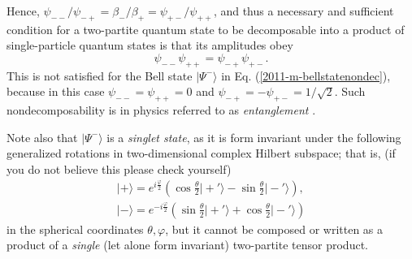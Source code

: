 {Hence,
$\psi_{--}/ \psi_{-+} =   \beta_- / \beta_+ =   \psi_{+-} / \psi_{++}$,
and thus a necessary and sufficient condition for a two-partite quantum state to be decomposable
into a product of single-particle quantum states is that its amplitudes obey
 \begin{equation}
\psi_{--}\psi_{++}  =  \psi_{-+}   \psi_{+-} .
\end{equation}
This is not satisfied for the Bell state $\vert \Psi^-\rangle$ in Eq. (\ref{2011-m-bellstatenondec}),
because in this case $\psi_{--}=\psi_{++} =0$
and  $ \psi_{-+} = - \psi_{+-} =1/\sqrt{2}$.
Such nondecomposability is in physics referred to as {\em entanglement}
\cite{CambridgeJournals:1737068,CambridgeJournals:2027212,schrodinger}.

Note also that $\vert \Psi^-\rangle$ is a {\em singlet state},
as it is form invariant under the following generalized rotations in two-dimensional complex Hilbert subspace; that is,
(if you do not believe this please check yourself)
\begin{equation}
\begin{split}
\vert + \rangle =
e^{ i{\frac{\varphi}{2}} }
\left(
\cos \frac{\theta}{2} \vert +'  \rangle
-
\sin \frac{\theta}{2} \vert -'   \rangle
\right),
\\
 \vert - \rangle =
e^{ -i{\frac{\varphi}{2}} }
\left(
\sin \frac{\theta}{2} \vert +'   \rangle
+
\cos \frac{\theta}{2} \vert -'  \rangle
\right)
\end{split}
\end{equation}
in the spherical coordinates $\theta , \varphi$,
but it cannot be composed or written as a product of a {\em single} (let alone form invariant) two-partite tensor product.

\eexample
}


%
%

